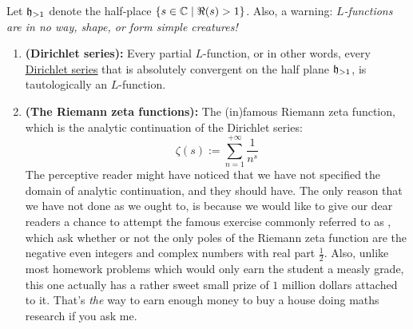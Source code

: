             \begin{example}
                Let $\mathfrak{h}_{> 1}$ denote the half-place $\{s \in \mathbb{C} \mid \Re(s) > 1\}$. Also, a warning: \textit{$L$-functions are in no way, shape, or form simple creatures!}
                \begin{enumerate}
                    \item \textbf{(Dirichlet series):}  Every partial $L$-function, or in other words, every \href{https://en.wikipedia.org/wiki/Dirichlet_series}{\underline{Dirichlet series}} that is absolutely convergent on the half plane $\mathfrak{h}_{> 1}$, is tautologically an $L$-function. 
                    \item \textbf{(The Riemann zeta functions):}  The (in)famous Riemann zeta function, which is the analytic continuation of the Dirichlet series:
                        $$\zeta(s) := \sum_{n = 1}^{+\infty} \frac{1}{n^s}$$
                    The perceptive reader might have noticed that we have not specified the domain of analytic continuation, and they should have. The only reason that we have not done as we ought to, is because we would like to give our dear readers a chance to attempt the famous exercise commonly referred to as , which ask whether or not the only poles of the Riemann zeta function are the negative even integers and complex numbers with real part $\frac12$. Also, unlike most homework problems which would only earn the student a measly grade, this one actually has a rather sweet small prize of $1$ million dollars attached to it. That's \textit{the} way to earn enough money to buy a house doing maths research if you ask me.
                    

\end{enumerate}
\end{example}
